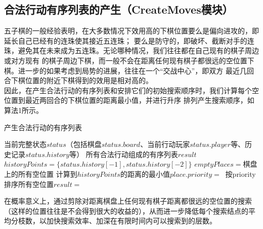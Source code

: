 \documentclass{acm_proc_article-sp}
\begin{document}
\subsection{\textbf{合法行动有序列表的产生（CreateMoves模块）}}
五子棋的一般经验表明，在大多数情况下效用高的下棋位置要么是偏向进攻的，即延长自己已经有的连珠使其接近五连珠；
要么是防守的，即破坏、截断对手的连珠，避免其在未来成为五连珠。无论哪种情况，我们往往都在自己现有的棋子周边或对方现有
的棋子周边下棋，而一般不会在距离任何现有棋子都很远的空位置下棋。进一步的如果考虑到局势的进展，往往在一个“交战中心”，即双方
最近几回合下棋位置的附近下棋得到的效用是相对高的。\\
因此，在产生合法行动的有序列表和安排它们的初始搜索顺序时，我们计算每个空位置到最近两回合的下棋位置的距离最小值，并进行升序
排列产生搜索顺序，如算法1所示。
\begin{algorithm}
       \algsetup {\tiny}
       \scriptsize
       \caption{产生合法行动的有序列表}
       \begin{algorithmic}[1] %
              \Require 当前完整状态$status$（包括棋盘$status.board$、当前行动玩家$status.player$等、历史记录$status.history$等）
              \Ensure 所有合法行动组成的有序列表$result$
                     \State $historyPoints = \{status.history[-1], status.history[-2]\}$
                     \State $emptyPlaces = $棋盘上的所有空位置
                            \State 计算到$historyPoints$的距离的最小值$place.priority =\ $
                     \EndFor
                     \State 按priority排序所有空位置$result =\ $
                     \State {}
              \EndFunction
       \end{algorithmic}
\end{algorithm}


在概率意义上，通过剪除对距离棋盘上任何现有棋子距离都很远的空位置的搜索
（这样的位置往往是不会得到很大的收益的），从而进一步降低每个搜索结点的平均分枝数，以加快搜索效率、加深在有限时间内可以搜索到的层数。\\
\end{document}
